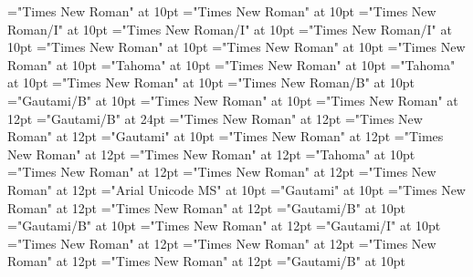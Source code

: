 \documentclass[c5paper,twoside]{article}
\begin{document}
\font\spanenspanensensesensesentryletDatadicBody="Times New Roman" at 10pt
\font\spanensensesensesentryletDatadicBody="Times New Roman" at 10pt
\font\spanenspanengrammaticalinfosensesensesentryletDatadicBody="Times New Roman/I" at 10pt
\font\spanengrammaticalinfosensesensesentryletDatadicBody="Times New Roman/I" at 10pt
\font\grammaticalinfosensesensesentryletDatadicBody="Times New Roman/I" at 10pt
\font\sensesensesentryletDatadicBody="Times New Roman" at 10pt
\font\sensesentryletDatadicBody="Times New Roman" at 10pt
\font\spanenpronunciationsentryletDatadicBody="Times New Roman" at 10pt
\font\spanggofonipaxemicpronunciationpronunciationsentryletDatadicBody="Tahoma" at 10pt
\font\spanenpronunciationpronunciationsentryletDatadicBody="Times New Roman" at 10pt
\font\pronunciationpronunciationsentryletDatadicBody="Tahoma" at 10pt
\font\pronunciationsentryletDatadicBody="Times New Roman" at 10pt
\font\spanenheadwordentryletDatadicBody="Times New Roman/B" at 10pt
\font\headwordentryletDatadicBody="Gautami/B" at 10pt
\font\entryletDatadicBody="Times New Roman" at 10pt
\font{}="Times New Roman" at 12pt
\font{}="Gautami/B" at 24pt
\font{}="Times New Roman" at 12pt
\font\xitemtpi="Times New Roman" at 12pt
\font\xitemxitemtranslationLdbefore="Gautami" at 10pt
\font\xitemxitemtranslationbefore="Times New Roman" at 12pt
\font\sensesensesensesbefore="Times New Roman" at 12pt
\font\xitemxitempronunciationsbefore="Times New Roman" at 12pt
\font\xitemxitempronunciationbefore="Tahoma" at 10pt
\font\xitemxitemprimaryrefsbefore="Times New Roman" at 12pt
\font\xitemxitempictureLabelbefore="Times New Roman" at 12pt
\font\xitemxitempartofspeechbefore="Times New Roman" at 12pt
\font\xitemxitemLexSensepublishStemGlossPubLebefore="Arial Unicode MS" at 10pt
\font\xitemxitemLexSensepublishStemGlossPubLdbefore="Gautami" at 10pt
\font\xitemxitemLexEntryTypepublishStemEntryTypeAbbreviationPubbefore="Times New Roman" at 12pt
\font\xitemxitemLexEntryTypepublishStemComplexFormTypeReverseAbbrPubbefore="Times New Roman" at 12pt
\font\xitemxitemLexEntrypublishStemComponentTargetHeadWordRefbefore="Gautami/B" at 10pt
\font\xitemxitemheadwordbefore="Gautami/B" at 10pt
\font\xitemxitemexamplesbefore="Times New Roman" at 12pt
\font\xitemxitemexamplebefore="Gautami/I" at 10pt
\font\xitemxitementryreftypebefore="Times New Roman" at 12pt
\font\xitemxitementryrefcomponentbefore="Times New Roman" at 12pt
\font\xitemxitemdefinitionbefore="Times New Roman" at 12pt
\font\xitemxitemcomplexformrefsbefore="Times New Roman" at 12pt
\font\xitemxitemcomplexformformbefore="Gautami/B" at 10pt
\end{document}
